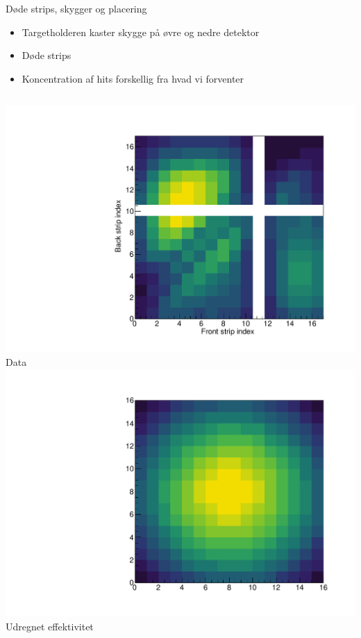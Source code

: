 \begin{frame}{Døde strips, skygger og placering}
	\begin{itemize}
		\item Targetholderen kaster skygge på øvre og nedre detektor
		\item Døde strips 
		\item Koncentration af hits forskellig fra hvad vi forventer
	\end{itemize}
	\begin{columns}
		\centering
		\includegraphics[width=\columnwidth]{../figures/mexihatDet4.pdf}
		\tiny Data
		\centering
		\includegraphics[width=\columnwidth]{../figures/mexihatDet4Theory.pdf}
		\tiny Udregnet effektivitet
	\end{columns}
\end{frame}